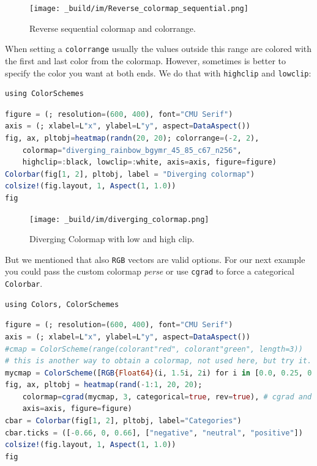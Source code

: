 \documentclass[
  notoc %
]{tufte-book}
\newcommand{\passthrough}[1]{#1}
\begin{document}
\begin{figure}
\hypertarget{fig:Reverse_colormap_sequential}{%
\centering
\texttt{[image: \_build/im/Reverse\_colormap\_sequential.png]}
\caption{Reverse sequential colormap and
colorrange.}\label{fig:Reverse_colormap_sequential}
}
\end{figure}

When setting a \passthrough{\lstinline!colorrange!} usually the values
outside this range are colored with the first and last color from the
colormap. However, sometimes is better to specify the color you want at
both ends. We do that with \passthrough{\lstinline!highclip!} and
\passthrough{\lstinline!lowclip!}:

\begin{lstlisting}
using ColorSchemes
\end{lstlisting}

\begin{lstlisting}[language=Julia]
figure = (; resolution=(600, 400), font="CMU Serif")
axis = (; xlabel=L"x", ylabel=L"y", aspect=DataAspect())
fig, ax, pltobj=heatmap(randn(20, 20); colorrange=(-2, 2),
    colormap="diverging_rainbow_bgymr_45_85_c67_n256",
    highclip=:black, lowclip=:white, axis=axis, figure=figure)
Colorbar(fig[1, 2], pltobj, label = "Diverging colormap")
colsize!(fig.layout, 1, Aspect(1, 1.0))
fig
\end{lstlisting}

\begin{figure}
\hypertarget{fig:diverging_colormap}{%
\centering
\texttt{[image: \_build/im/diverging\_colormap.png]}
\caption{Diverging Colormap with low and high
clip.}\label{fig:diverging_colormap}
}
\end{figure}

But we mentioned that also \passthrough{\lstinline!RGB!} vectors are
valid options. For our next example you could pass the custom colormap
\emph{perse} or use \passthrough{\lstinline!cgrad!} to force a
categorical \passthrough{\lstinline!Colorbar!}.

\begin{lstlisting}
using Colors, ColorSchemes
\end{lstlisting}

\begin{lstlisting}[language=Julia]
figure = (; resolution=(600, 400), font="CMU Serif")
axis = (; xlabel=L"x", ylabel=L"y", aspect=DataAspect())
#cmap = ColorScheme(range(colorant"red", colorant"green", length=3))
# this is another way to obtain a colormap, not used here, but try it.
mycmap = ColorScheme([RGB{Float64}(i, 1.5i, 2i) for i in [0.0, 0.25, 0.35, 0.5]])
fig, ax, pltobj = heatmap(rand(-1:1, 20, 20);
    colormap=cgrad(mycmap, 3, categorical=true, rev=true), # cgrad and Symbol, mycmap
    axis=axis, figure=figure)
cbar = Colorbar(fig[1, 2], pltobj, label="Categories")
cbar.ticks = ([-0.66, 0, 0.66], ["negative", "neutral", "positive"])
colsize!(fig.layout, 1, Aspect(1, 1.0))
fig
\end{lstlisting}
\end{document}
